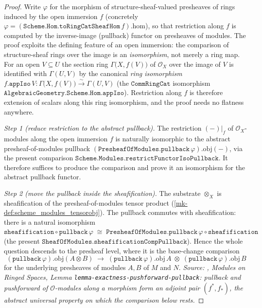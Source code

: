 \begin{proof}
  Write \(\varphi\) for the morphism of structure-sheaf-valued presheaves of
  rings induced by the open immersion \(f\) (concretely
  \(\varphi = (\mathtt{Scheme.Hom.toRingCatSheafHom}\,f).\mathrm{hom}\)), so that
  restriction along \(f\) is computed by the inverse-image (pullback) functor on
  presheaves of modules. The proof exploits the defining feature of an open
  immersion: the comparison of structure-sheaf rings over the image is an
  \emph{isomorphism}, not merely a ring map. For an open \(V \subseteq U\) the
  section ring \(\Gamma\bigl(X, f(V)\bigr)\) of \(\mathcal{O}_X\) over the image
  of \(V\) is identified with \(\Gamma(U, V)\) by the canonical \emph{ring
  isomorphism}
  \(f.\mathtt{appIso}\,V : \Gamma\bigl(X, f(V)\bigr) \xrightarrow{\sim}
  \Gamma(U, V)\)
  (the \(\mathtt{CommRingCat}\) isomorphism
  \(\mathtt{AlgebraicGeometry.Scheme.Hom.appIso}\)). Restriction along \(f\) is
  therefore extension of scalars along
  this ring isomorphism, and the proof needs no flatness anywhere.

  \emph{Step 1 (reduce restriction to the abstract pullback).} The restriction
  \((-)|_f\) of \(\mathcal{O}_X\)-modules along the open immersion \(f\) is
  naturally isomorphic to the abstract presheaf-of-modules pullback
  \((\mathtt{PresheafOfModules.pullback}\,\varphi).\mathrm{obj}(-)\), via the
  present comparison \(\mathtt{Scheme.Modules.restrictFunctorIsoPullback}\). It
  therefore suffices to produce the comparison and prove it an isomorphism for
  the abstract pullback functor.

  \emph{Step 2 (move the pullback inside the sheafification).} The substrate
  \(\otimes_X\) is sheafification of the presheaf-of-modules tensor product
  (\ref{mk-def:scheme_modules_tensorobj}). The pullback commutes with
  sheafification: there is a natural isomorphism
  \(\mathtt{sheafification} \circ \mathtt{pullback}\,\varphi
   \;\cong\;
   \mathtt{PresheafOfModules.pullback}\,\varphi \circ \mathtt{sheafification}\)
  (the present \(\mathtt{SheafOfModules.sheafificationCompPullback}\)). Hence the
  whole question descends to the presheaf level, where it is the base-change
  comparison
  \[
    (\mathtt{pullback}\,\varphi).\mathrm{obj}(A \otimes B)
      \;\longrightarrow\;
    (\mathtt{pullback}\,\varphi).\mathrm{obj}\,A
      \;\otimes\;
    (\mathtt{pullback}\,\varphi).\mathrm{obj}\,B
  \]
  for the underlying presheaves of modules \(A, B\) of \(M\) and \(N\).
  \textit{Source: \cite{stacks-project}, Modules on Ringed Spaces, Lemma
  \texttt{lemma-exactness-pushforward-pullback}: pullback and pushforward of
  $\mathcal{O}$-modules along a morphism form an adjoint pair $(f^*, f_*)$, the
  abstract universal property on which the comparison below rests.}


\end{proof}
